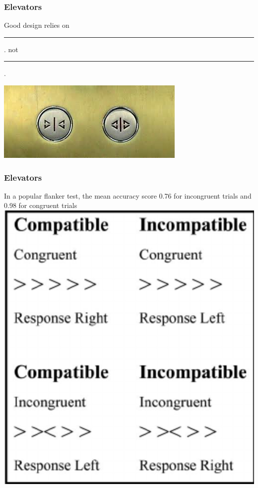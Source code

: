 \documentclass{beamer}
\begin{document}
\begin{frame}
\frametitle{Elevators}
\begin{center}
Good design relies on \rule{2cm}{0.15mm}. not  \rule{2cm}{0.15mm}.

\end{center}
\centering
\includegraphics[width=.7\linewidth]{elevator_bt}
\end{frame}

\begin{frame}
\frametitle{Elevators}
In a popular flanker test, the mean accuracy score 0.76 for incongruent trials and 0.98 for congruent trials
\newline \newline
\centering
\includegraphics[width=.4\linewidth]{flanker}
\end{frame}
\end{document}
